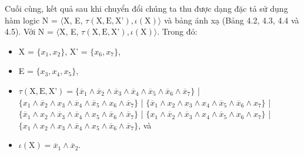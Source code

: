 \documentclass[a4paper,13pt,oneside,openany]{book}
\begin{document}
\begin{flushleft}
	Cuối cùng, kết quả sau khi chuyển đổi chúng ta thu được dạng đặc tả sử dụng hàm logic N = $\langle$X, E, $\tau(\textrm{X}, \textrm{E}, \textrm{X'}), \iota(\textrm{X})\rangle$ và bảng ánh xạ (Bảng 4.2, 4.3, 4.4 và 4.5). Với N = $\langle$X, E, $\tau(\textrm{X}, \textrm{E}, \textrm{X'}), \iota(\textrm{X})\rangle$. Trong đó:
	\begin{itemize}
		\item X = $\{x_1, x_2\}$, X' = $\{x_6, x_7\}$,
		\item E = $\{x_3, x_4, x_5\}$,
		\item $\tau(\textrm{X}, \textrm{E}, \textrm{X'}) = \{\overline{x}_1 \land \overline{x}_2 \land \overline{x}_3 \land \overline{x}_4 \land \overline{x}_5 \land \overline{x}_6 \land \overline{x}_7\}$ | $\{x_1 \land \overline{x}_2 \land x_3 \land \overline{x}_4 \land \overline{x}_5 \land x_6 \land \overline{x}_7\}$ | $\{\overline{x}_1 \land x_2 \land x_3 \land x_4 \land \overline{x}_5 \land \overline{x}_6 \land x_7\}$ | $\{\overline{x}_1 \land x_2 \land \overline{x}_3 \land \overline{x}_4 \land x_5 \land \overline{x}_6 \land \overline{x}_7\}$ | $\{x_1 \land \overline{x}_2 \land \overline{x}_3 \land x_4 \land \overline{x}_5 \land x_6 \land x_7\}$ | $\{x_1 \land x_2 \land x_3 \land \overline{x}_4 \land x_5 \land \overline{x}_6 \land \overline{x}_7\}$, và
		\item $\iota(\textrm{X}) = \overline{x}_1 \land \overline{x}_2$.
	\end{itemize}

\end{flushleft}
\end{document}
